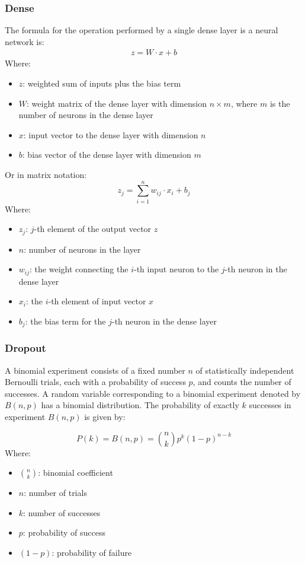 \documentclass[a4paper]{article}
\begin{document}
\subsubsection*{Dense}
The formula for the operation performed by a single dense layer is a neural network is:
\begin{align*}
    z = W \cdot x + b
\end{align*}
Where:
\begin{itemize}
    \item $z$: weighted sum of inputs plus the bias term
    \item $W$: weight matrix of the dense layer with dimension $n \times m$, where $m$ is the number of neurons in the dense layer
    \item $x$: input vector to the dense layer with dimension $n$
    \item $b$: bias vector of the dense layer with dimension $m$
\end{itemize}

Or in matrix notation:
\begin{equation*}
    z_j = \sum_{i=1}^{n} w_{ij} \cdot x_i + b_j
\end{equation*}
Where:
\begin{itemize}
    \item $z_j$: $j$-th element of the output vector $z$
    \item $n$: number of neurons in the layer
    \item $w_{ij}$: the weight connecting the $i$-th input neuron to the $j$-th neuron in the dense layer
    \item $x_i$: the $i$-th element of input vector $x$
    \item $b_j$: the bias term for the $j$-th neuron in the dense layer
\end{itemize}

\subsubsection*{Dropout}
A binomial experiment consists of a fixed number $n$ of statistically independent Bernoulli trials, each with a probability of success $p$, and counts the number of successes. A random variable corresponding to a binomial experiment denoted by $B(n,p)$ has a binomial distribution. The probability of exactly $k$ successes in experiment $B(n,p)$ is given by:

\begin{equation*}
    P(k) = B(n,p) = \binom{n}{k} p^k (1-p)^{n-k}
\end{equation*}
Where:
\begin{itemize}
    \item $\binom{n}{k}$: binomial coefficient
    \item $n$: number of trials
    \item $k$: number of successes
    \item $p$: probability of success
    \item $(1-p)$: probability of failure
\end{itemize}
\end{document}
